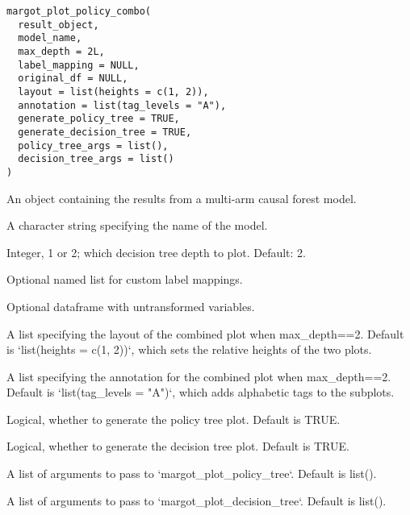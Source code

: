 \documentclass[a4paper]{book}
\begin{document}
%
\begin{Usage}
\begin{verbatim}
margot_plot_policy_combo(
  result_object,
  model_name,
  max_depth = 2L,
  label_mapping = NULL,
  original_df = NULL,
  layout = list(heights = c(1, 2)),
  annotation = list(tag_levels = "A"),
  generate_policy_tree = TRUE,
  generate_decision_tree = TRUE,
  policy_tree_args = list(),
  decision_tree_args = list()
)
\end{verbatim}
\end{Usage}
%
\begin{Arguments}
\begin{ldescription}
\item[\code{result\_object}] An object containing the results from a multi-arm causal forest model.

\item[\code{model\_name}] A character string specifying the name of the model.

\item[\code{max\_depth}] Integer, 1 or 2; which decision tree depth to plot. Default: 2.

\item[\code{label\_mapping}] Optional named list for custom label mappings.

\item[\code{original\_df}] Optional dataframe with untransformed variables.

\item[\code{layout}] A list specifying the layout of the combined plot when max\_depth==2. Default is
`list(heights = c(1, 2))`, which sets the relative heights of the two plots.

\item[\code{annotation}] A list specifying the annotation for the combined plot when max\_depth==2. Default is
`list(tag\_levels = "A")`, which adds alphabetic tags to the subplots.

\item[\code{generate\_policy\_tree}] Logical, whether to generate the policy tree plot. Default is TRUE.

\item[\code{generate\_decision\_tree}] Logical, whether to generate the decision tree plot. Default is TRUE.

\item[\code{policy\_tree\_args}] A list of arguments to pass to `margot\_plot\_policy\_tree`. Default is list().

\item[\code{decision\_tree\_args}] A list of arguments to pass to `margot\_plot\_decision\_tree`. Default is list().
\end{ldescription}
\end{Arguments}
\end{document}

